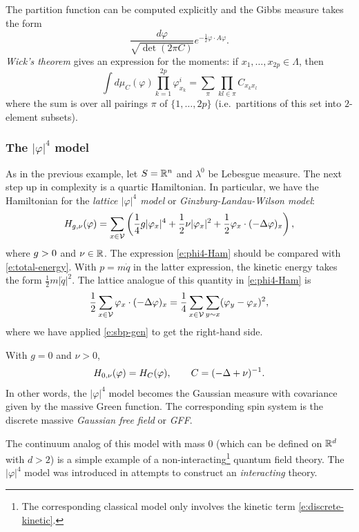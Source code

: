 The partition function can be computed explicitly and the Gibbs measure takes
the form
\begin{equation}
\label{e:gauss-density}
\frac{d\varphi}{\sqrt{\det(2\pi C)}}
e^{-\tfrac12 \varphi \cdot A \varphi}.
\end{equation}
\emph{Wick's theorem} gives an expression for the moments:
if $x_1, \ldots, x_{2p} \in \Lambda$, then
\begin{equation}
\label{e:wick}
\int d\mu_C(\varphi) \prod_{k=1}^{2p} \varphi^i_{x_k}
	=
\sum_\pi \prod_{kl\in\pi} C_{x_kx_l}
\end{equation}
where the sum is over all pairings $\pi$ of $\{1,\ldots,2p\}$ (i.e.\ partitions of
this set into $2$-element subsets).

\subsubsection{The $|\varphi|^4$ model}

As in the previous example, let $S = {\mathbb R}^n$ and $\lambda^0$ be Lebesgue measure.
The next step up in complexity is a quartic Hamiltonian. In particular, we have
the Hamiltonian for the \emph{lattice $|\varphi|^4$ model} or \emph{Ginzburg-Landau-Wilson model}:
\begin{equation}
\label{e:phi4-Ham}
H_{g,\nu}(\varphi)
  =
\sum_{x\in\mathcal{V}}
\left(
  \frac{1}{4} g |\varphi_x|^4
    +
  \frac{1}{2} \nu |\varphi_x|^2
    +
  \frac{1}{2} \varphi_x \cdot (-\Delta \varphi)_x
\right),
\end{equation}
where $g > 0$ and $\nu\in{\mathbb R}$.
The expression \eqref{e:phi4-Ham} should be compared with \eqref{e:total-energy}.
With $p = m \dot q$ in the latter expression, the kinetic energy takes the form
$\tfrac12 m |\dot q|^2$. The lattice analogue of this quantity in \eqref{e:phi4-Ham} is
\begin{equation}
\label{e:discrete-kinetic}
\frac12 \sum_{x\in\mathcal{V}} \varphi_x \cdot (-\Delta \varphi)_x
	=
\frac14 \sum_{x\in\mathcal{V}} \sum_{y\sim x} (\varphi_y - \varphi_x)^2,
\end{equation}
where we have applied \eqref{e:sbp-gen} to get the right-hand side.

\begin{example}
With $g = 0$ and $\nu > 0$,
\begin{equation}
H_{0,\nu}(\varphi) = H_C(\varphi),
	\qquad
C = (-\Delta + \nu)^{-1}.
\end{equation}
In other words, the $|\varphi|^4$ model becomes the Gaussian measure with covariance given
by the massive Green function. The corresponding spin system is the discrete massive
\emph{Gaussian free field} or \emph{GFF}.

The continuum analog of this model with mass $0$
(which can be defined on ${ {{\mathbb R}}^d}$ with $d > 2$) is a simple example of a
non-interacting\footnote{The corresponding classical model only involves the kinetic term
\eqref{e:discrete-kinetic}.} quantum field theory. The $|\varphi|^4$ model was introduced
in attempts to construct an \emph{interacting} theory.
\end{example}

